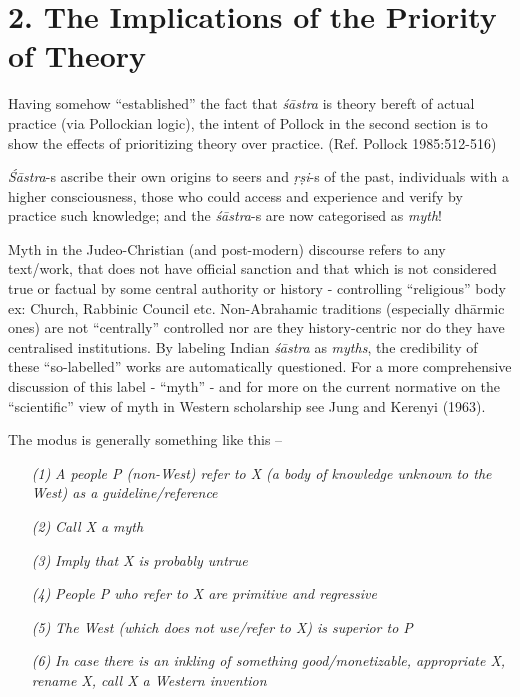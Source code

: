 \section*{2. The Implications of the Priority of Theory}

Having somehow ``established'' the fact that {\sl śāstra} is theory bereft of actual practice (via Pollockian logic), the intent of Pollock in the second section is to show the effects of prioritizing theory over practice. (Ref. Pollock 1985:512-516)

{\sl Śāstra}-s ascribe their own origins to seers and {\sl ṛṣi}-s of the past, individuals with a higher consciousness, those who could access and experience and verify by practice such knowledge; and the {\sl śāstra}-s are now categorised as {\sl myth}!

Myth in the Judeo-Christian (and post-modern) discourse refers to any text/work, that does not have official sanction and that which is not considered true or factual by some central authority or history - controlling ``religious'' body ex: Church, Rabbinic Council etc. Non-Abrahamic traditions (especially dhārmic ones) are not ``centrally'' controlled nor are they history-centric nor do they have centralised institutions. By labeling Indian {\sl śāstra} as {\sl myths}, the credibility of these ``so-labelled'' works are automatically questioned. For a more comprehensive discussion of this label -  ``myth'' - and for more on the current normative on the ``scientific'' view of myth in Western scholarship see Jung and Kerenyi (1963).

The modus is generally something like this --
\begin{itemize}
\itemsep=1pt
\item[{\sl(1)}] {\sl A people P (non-West) refer to X (a body of knowledge unknown to the West) as a guideline/reference}

\item[{\sl(2)}] {\sl Call X  a myth} 

\item[{\sl(3)}] {\sl Imply that X is probably untrue}

\item[{\sl(4)}] {\sl People P who refer to X are primitive and regressive}

\item[{\sl(5)}] {\sl The West (which does not use/refer to X) is superior to P}

\item[{\sl(6)}] {\sl In case there is an inkling of something good/monetizable, appropriate X, rename X, call X a Western invention} 
\end{itemize}

